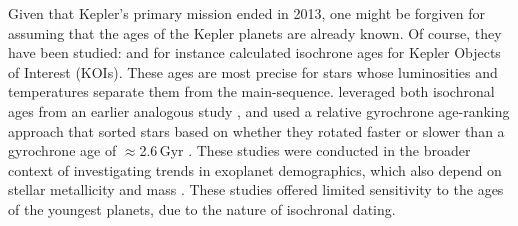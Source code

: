 \documentclass[11pt,twocolumn,tighten]{aastex63}
\begin{document}
Given that Kepler's primary mission ended in 2013, one might be
forgiven for assuming that the ages of the Kepler planets are already
known.  Of course, they have been studied: \citet{Berger_2020b_rpage}
and \citet{Petigura_2022} for instance calculated isochrone ages for
Kepler Objects of Interest (KOIs).  These ages are most precise for
stars whose luminosities and temperatures separate them from the
main-sequence.  \citet{David_2021} leveraged both isochronal ages from
an earlier analogous study \citep{Fulton_Petigura_2018_cks_vii}, and
used a relative gyrochrone age-ranking approach that sorted stars
based on whether they rotated faster or slower than a gyrochrone age
of $\approx$2.6\,Gyr \citep{Meibom_2015,Curtis_2020}.  These studies
were conducted in the broader context of investigating trends in
exoplanet demographics, which also depend on stellar metallicity and
mass \citep{Petigura_2018}.  These studies offered limited sensitivity
to the ages of the youngest planets, due to the nature of isochronal
dating.




\end{document}
